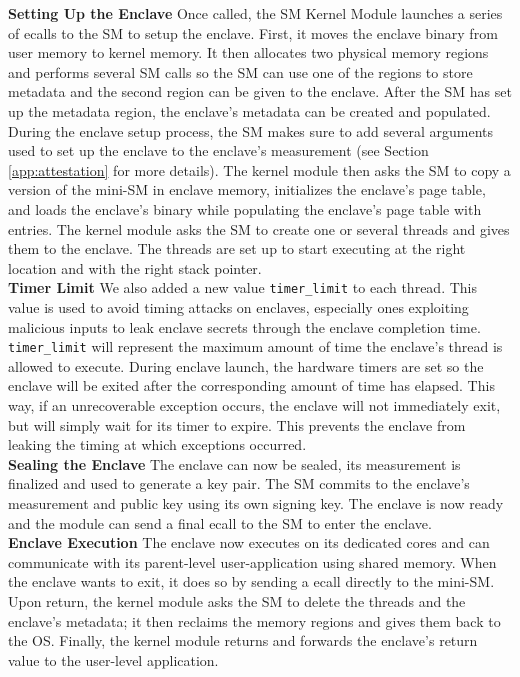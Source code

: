 \noindent\textbf{Setting Up the Enclave}
Once called, the SM Kernel Module launches a series of ecalls to the SM to setup the enclave.
First, it moves the enclave binary from user memory to kernel memory.
It then allocates two physical memory regions and performs several SM calls so the SM can use one of the regions to store metadata and the second region can be given to the enclave.
After the SM has set up the metadata region, the enclave's metadata can be created and populated.
During the enclave setup process, the SM makes sure to add several arguments used to set up the enclave to the enclave's measurement (see Section \ref{app:attestation} for more details).
The kernel module then asks the SM to copy a version of the mini-SM in enclave memory, initializes the enclave's page table, and loads the enclave's binary while populating the enclave's page table with entries.
The kernel module asks the SM to create one or several threads and gives them to the enclave. 
The threads are set up to start executing at the right location and with the right stack pointer.
\\

\noindent\textbf{Timer Limit}
We also added a new value \texttt{timer\_limit} to each thread.
This value is used to avoid timing attacks on enclaves, especially ones exploiting malicious inputs to leak enclave secrets through the enclave completion time.
\texttt{timer\_limit} will represent the maximum amount of time the enclave's thread is allowed to execute.
During enclave launch, the hardware timers are set so the enclave will be exited after the corresponding amount of time has elapsed.
This way, if an unrecoverable exception occurs, the enclave will not immediately exit, but will simply wait for its timer to expire.
This prevents the enclave from leaking the timing at which exceptions occurred.
\\

\noindent\textbf{Sealing the Enclave}
The enclave can now be sealed, its measurement is finalized and used to generate a key pair.
The SM commits to the enclave's measurement and public key using its own signing key.
The enclave is now ready and the module can send a final ecall to the SM to enter the enclave.
\\

\noindent\textbf{Enclave Execution}
The enclave now executes on its dedicated cores and can communicate with its parent-level user-application using shared memory.
When the enclave wants to exit, it does so by sending a ecall directly to the mini-SM.
Upon return, the kernel module asks the SM to delete the threads and the enclave's metadata; it then reclaims the memory regions and gives them back to the OS.
Finally, the kernel module returns and forwards the enclave's return value to the user-level application.

